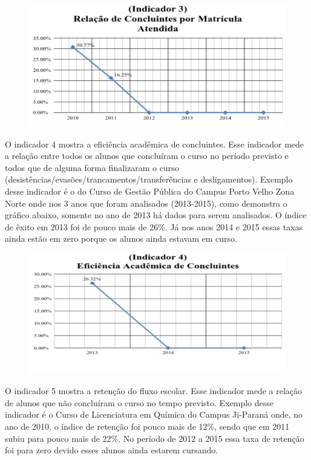 \documentclass[article,12pt,onesidea,4paper,english,brazil]{abntex2}
\begin{document}
	\begin{figure}[ht]
		\centering
		\includegraphics[width=.9\linewidth]{PIP-97-3}
	\end{figure}
	
	O indicador 4 mostra a eficiência acadêmica de concluintes. Esse indicador mede a relação
	entre todos os alunos que concluíram o curso no período previsto e todos que de alguma forma
	finalizaram o curso (desistências/evasões/trancamentos/transferências e desligamentos). Exemplo
	desse indicador é o do Curso de Gestão Pública do Campus Porto Velho Zona Norte onde nos 3
	anos que foram analisados (2013-2015), como demonstra o gráfico abaixo, somente no ano de
	2013 há dados para serem analisados. O índice de êxito em 2013 foi de pouco mais de 26\%. Já
	nos anos 2014 e 2015 essas taxas ainda estão em zero porque os alunos ainda estavam em curso.
	
	\begin{figure}[ht]
		\centering
		\includegraphics[width=.9\linewidth]{PIP-97-4}
	\end{figure}

	O indicador 5 mostra a retenção do fluxo escolar. Esse indicador mede a relação de alunos
	que não concluíram o curso no tempo previsto. Exemplo desse indicador é o Curso de
	Licenciatura em Química do Campus Ji-Paraná onde, no ano de 2010, o índice de retenção foi
	pouco mais de 12\%, sendo que em 2011 subiu para pouco mais de 22\%. No período de 2012 a
	2015 essa taxa de retenção foi para zero devido esses alunos ainda estarem cursando.
	
\end{document}
